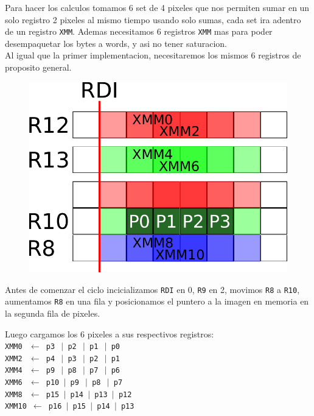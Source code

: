 Para hacer los calculos tomamos 6 set de 4 pixeles que nos permiten sumar en un solo registro 2 pixeles al mismo tiempo usando solo sumas, cada set ira adentro de un registro \texttt{XMM}. Ademas necesitamos 6 registros \texttt{XMM} mas para poder desempaquetar los bytes a words, y asi no tener saturacion. \\

Al igual que la primer implementacion, necesitaremos los mismos 6 registros de proposito general. \\

\begin{figure}[h!]
	\centering
	\includegraphics[scale=0.5]{images/BlurASM2_0}
\end{figure}

Antes de comenzar el ciclo incicializamos \texttt{RDI} en 0, \texttt{R9} en 2, movimos \texttt{R8} a \texttt{R10}, aumentamos \texttt{R8} en una fila y posicionamos el puntero a la imagen en memoria en la segunda fila de pixeles.

Luego cargamos los 6 pixeles a sus respectivos registros:\\

\noindent
\texttt{XMM0 $\ \gets$ p3 $\ \vert$ p2 $\ \vert$ p1 $\ \vert$ p0} \\
\texttt{XMM2 $\ \gets$ p4 $\ \vert$ p3 $\ \vert$ p2 $\ \vert$ p1} \\
\texttt{XMM4 $\ \gets$ p9 $\ \vert$ p8 $\ \vert$ p7 $\ \vert$ p6} \\
\texttt{XMM6 $\ \gets$ p10 $\vert$ p9 $\ \vert$ p8 $\ \vert$ p7} \\
\texttt{XMM8 $\ \gets$ p15 $\vert$ p14 $\vert$ p13 $\vert$ p12} \\
\texttt{XMM10 $\gets$ p16 $\vert$ p15 $\vert$ p14 $\vert$ p13} \\


